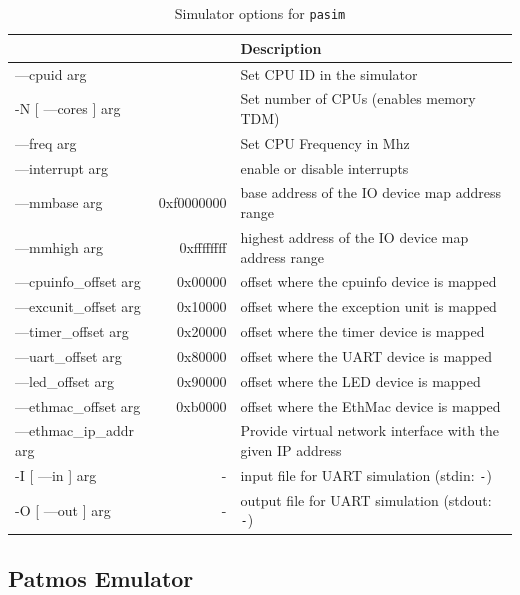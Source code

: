 \documentclass[a4paper,fontsize=10pt,twoside,DIV15,BCOR12mm,headinclude=true,footinclude=false,pagesize,bibtotoc]{scrbook}
\begin{document}
\begin{table}
  \centering
  \caption{Simulator options for \texttt{pasim}}
  \label{tab:pasimopts_sim}
  \begin{tabular}{>{\ttfamily}l<{}>{\ttfamily}r<{}p{}}
    \toprule
    \multicolumn{1}{l}{Option} & \multicolumn{1}{l}{Default} & Description \\
    \midrule
   ---cpuid arg           & 0          & Set CPU ID in the simulator \\
   -N [ ---cores ] arg    & 1          & Set number of CPUs (enables memory TDM) \\
   ---freq arg            & 80         & Set CPU Frequency in Mhz \\
   ---interrupt arg       & 1          & enable or disable interrupts \\
   ---mmbase arg          & 0xf0000000 & base address of the IO device map address range \\
   ---mmhigh arg          & 0xffffffff & highest address of the IO device map address range \\
   ---cpuinfo\_offset arg & 0x00000    & offset where the cpuinfo device is mapped \\
   ---excunit\_offset arg & 0x10000    & offset where the exception unit is mapped \\
   ---timer\_offset arg   & 0x20000    & offset where the timer device is mapped \\
   ---uart\_offset arg    & 0x80000    & offset where the UART device is mapped \\
   ---led\_offset arg     & 0x90000    & offset where the LED device is mapped \\
   ---ethmac\_offset arg  & 0xb0000    & offset where the EthMac device is mapped \\
   ---ethmac\_ip\_addr arg &           & Provide virtual network interface with the given IP address \\
   -I [ ---in ] arg       & -          & input file for UART simulation (stdin: \texttt{-}) \\
   -O [ ---out ] arg      & -          & output file for UART simulation (stdout: \texttt{-}) \\
    \bottomrule
  \end{tabular}
\end{table}

\subsection{Patmos Emulator}
\end{document}

